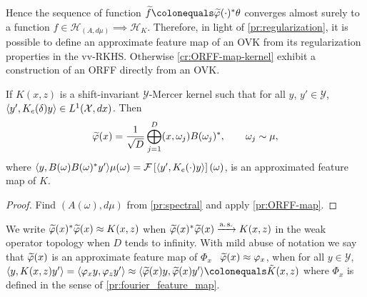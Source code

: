 Hence the sequence of function $\tildef{D}\colonequals \tildePhi{1:D}(\cdot)^\adjoint \theta$ converges almost surely to a function $f\in\mathcal{H}_{(A,d\mu)}{\scriptstyle\implies} \mathcal{H}_K$. Therefore, in light of \cref{pr:regularization}, it is possible to define an approximate feature map of an \acl{OVK} from its regularization properties in the \acs{vv-RKHS}.
Otherwise \cref{cr:ORFF-map-kernel} exhibit a construction of an \acs{ORFF} directly from an \acs{OVK}.
\begin{corollary}
\label{cr:ORFF-map-kernel}
If $K(x,z)$ is a shift-invariant $\mathcal{Y}$-Mercer kernel such that for all $y$, $y'\in\mathcal{Y}$, $\langle y', K_e(\delta)y\rangle\in L^1(\mathcal{X},dx)$. Then
\begin{equation}
\tildePhi{1:D}(x)= \frac{1}{\sqrt{D}}\Vect_{j=1}^D\pairing{x, \omega_j}B(\omega_j)^\adjoint , \qquad \omega_j \sim \mu,
\end{equation}
where $\langle y, B(\omega)B(\omega)^* y'\rangle\mu(\omega)=\mathcal{F}\left[\langle y', K_e(\cdot)y\rangle\right](\omega)$, is an approximated feature map of $K$.
\end{corollary}
\begin{proof}
Find $(A(\omega), d\mu)$ from \cref{pr:spectral} and apply \cref{pr:ORFF-map}.
\end{proof}

We write $\tildePhi{1:D}(x)^\adjoint \tildePhi{1:D}(x)\approx K(x,z)$ when $\tildePhi{1:D}(x)^\adjoint \tildePhi{1:D}(x)\converges{\asurely}{} K(x,z)$ in the weak operator topology when $D$ tends to infinity. With mild abuse of notation we say that $\tildePhi{1:D}(x)$ is an approximate feature map of $\Phi_x$ \ie~$\tildePhi{1:D}(x)\approx \Phi_x$, when for all $y\in\mathcal{Y}$, $\inner{y, K(x,z)y'}=\inner{\Phi_x y, \Phi_z y'}\approx \inner{\tildePhi{1:D}(x)y, \tildePhi{1:D}(x)y'}\colonequals \tilde{K}(x,z)$ where $\Phi_x$ is defined in the sense of \cref{pr:fourier_feature_map}.

